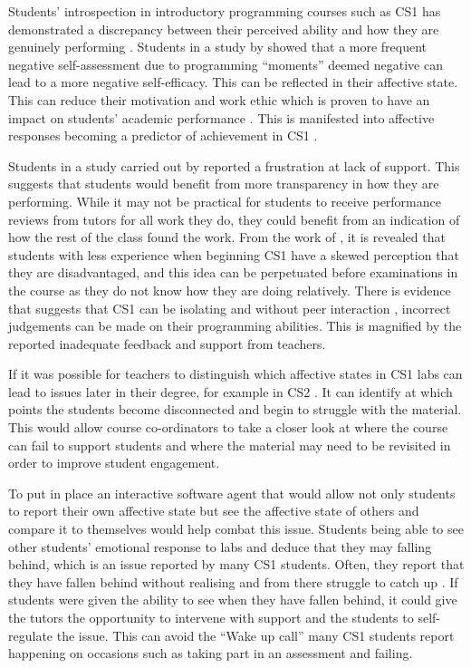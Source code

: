 \documentclass{l4proj}
\begin{document}
Students’ introspection in introductory programming courses such as CS1 has demonstrated a discrepancy between their perceived ability and how they are genuinely performing \citep{gorson_why_2020}. Students in a study by \cite{gorson_why_2020} showed that a more frequent negative self-assessment due to programming “moments” deemed negative can lead to a more negative self-efficacy. This can be reflected in their affective state. This can reduce their motivation and work ethic which is proven to have an impact on students’ academic performance \citep{kaur_affective_2021}. This is manifested into affective responses becoming a predictor of achievement in CS1 \citep{rodrigo_affective_2009} .

Students in a study carried out by \cite{petersen_revisiting_2016} reported a frustration at lack of support. This suggests that students would benefit from more transparency in how they are performing. While it may not be practical for students to receive performance reviews from tutors for all work they do, they could benefit from an indication of how the rest of the class found the work. From the work of \citeauthor{petersen_revisiting_2016}, it is revealed that students with less experience when beginning CS1 have a skewed perception that they are disadvantaged, and this idea can be perpetuated before examinations in the course as they do not know how they are doing relatively. There is evidence that suggests that CS1 can be isolating and without peer interaction \citep{marco-galindo_why_2022}, incorrect judgements can be made on their programming abilities. This is magnified by the reported inadequate feedback and support from teachers.

If it was possible for teachers to distinguish which affective states in CS1 labs can lead to issues later in their degree, for example in CS2 \citep{danielsiek_stay_2016}. It can identify at which points the students become disconnected and begin to struggle with the material. This would allow course co-ordinators to take a closer look at where the course can fail to support students and where the material may need to be revisited in order to improve student engagement.

To put in place an interactive software agent that would allow not only students to report their own affective state but see the affective state of others and compare it to themselves would help combat this issue. Students being able to see other students’ emotional response to labs and deduce that they may falling behind, which is an issue reported by many CS1 students. Often, they report that they have fallen behind without realising and from there struggle to catch up \citep{petersen_revisiting_2016}. If students were given the ability to see when they have fallen behind, it could give the tutors the opportunity to intervene with support and the students to self-regulate the issue. This can avoid the “Wake up call” many CS1 students report happening on occasions such as taking part in an assessment and failing.
\end{document}
